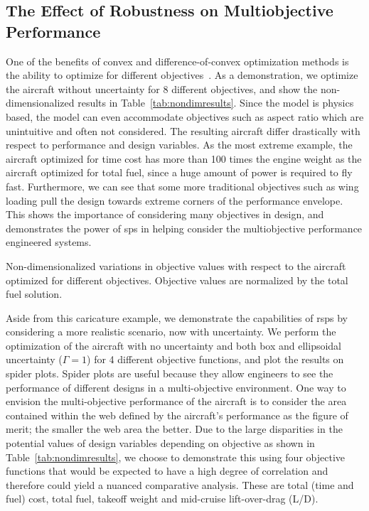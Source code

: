 \subsection{The Effect of Robustness on Multiobjective Performance}

One of the benefits of convex and difference-of-convex optimization methods is the ability to optimize for
different objectives~\cite{York2018}. As a demonstration, we optimize the aircraft without uncertainty
for 8 different objectives, and show
the non-dimensionalized results in Table~\ref{tab:nondimresults}.
Since the model is physics based, the model can even accommodate objectives such as aspect ratio
which are unintuitive and often not considered. The resulting aircraft
differ drastically with respect to performance and design variables.
As the most extreme example,
the aircraft optimized for time cost has more than 100 times the engine weight as the aircraft
optimized for total fuel, since a huge amount of power is required to fly fast. Furthermore, we can see
that some more traditional objectives such as wing loading pull the design
towards extreme corners of the performance envelope. This shows the importance of considering many objectives
in design, and demonstrates the power of \gls{sp}s in helping
consider the multiobjective performance engineered systems.

\begin{table}
\caption{Non-dimensionalized variations in objective values with respect to the aircraft optimized
for different objectives. Objective values are normalized by the total fuel solution.}
    \label{tab:nondimresults}
\end{table}

Aside from this caricature example, we demonstrate the capabilities of \gls{rsp}s
by considering a more realistic scenario, now with uncertainty.
We perform the optimization of the aircraft with no uncertainty and both box and
ellipsoidal uncertainty ($\Gamma = 1$)
for 4 different objective functions, and plot the results on spider plots.
Spider plots are useful because they allow engineers to see the performance of
different designs in a multi-objective
environment. One way to envision the multi-objective
performance of the aircraft is to consider the area contained within the web defined by the aircraft's
performance as the figure of merit; the smaller the web area the better.
Due to the large disparities in the potential values of design variables depending
on objective as shown in Table~\ref{tab:nondimresults}, we choose to demonstrate this using four objective functions
that would be expected to have a high degree of correlation and therefore could yield a
nuanced comparative analysis. These are
total (time and fuel) cost, total fuel, takeoff weight and mid-cruise lift-over-drag (L/D).

